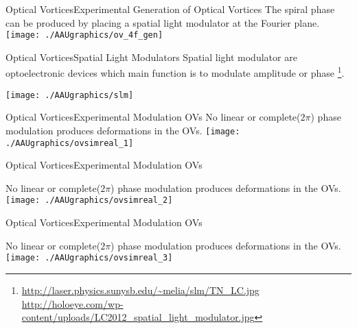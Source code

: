 \documentclass[10pt]{beamer}
\begin{document}
\begin{frame}{Optical Vortices}{Experimental Generation of Optical Vortices}
The spiral phase can be produced by placing a spatial light modulator at the Fourier plane.
\texttt{[image: ./AAUgraphics/ov\_4f\_gen]}
\end{frame}

\begin{frame}{Optical Vortices}{Spatial Light Modulators}
Spatial light modulator are optoelectronic devices which main function is to modulate amplitude or phase \footnote[3]{\scriptsize \url{http://laser.physics.sunysb.edu/~melia/slm/TN_LC.jpg} \\ \url{http://holoeye.com/wp-content/uploads/LC2012_spatial_light_modulator.jpg}}.

\hspace*{10pt}

\texttt{[image: ./AAUgraphics/slm]}
\end{frame}

\begin{frame}{Optical Vortices}{Experimental Modulation OVs}
No linear or complete($2\pi$) phase modulation produces deformations in the OVs.
\texttt{[image: ./AAUgraphics/ovsimreal\_1]}
\end{frame}

\begin{frame}{Optical Vortices}{Experimental Modulation OVs}
\addtocounter{framenumber}{-1}
No linear or complete($2\pi$) phase modulation produces deformations in the OVs.
\texttt{[image: ./AAUgraphics/ovsimreal\_2]}
\end{frame}

\begin{frame}{Optical Vortices}{Experimental Modulation OVs}
\addtocounter{framenumber}{-1}
No linear or complete($2\pi$) phase modulation produces deformations in the OVs.
\texttt{[image: ./AAUgraphics/ovsimreal\_3]}
\end{frame}
\end{document}
